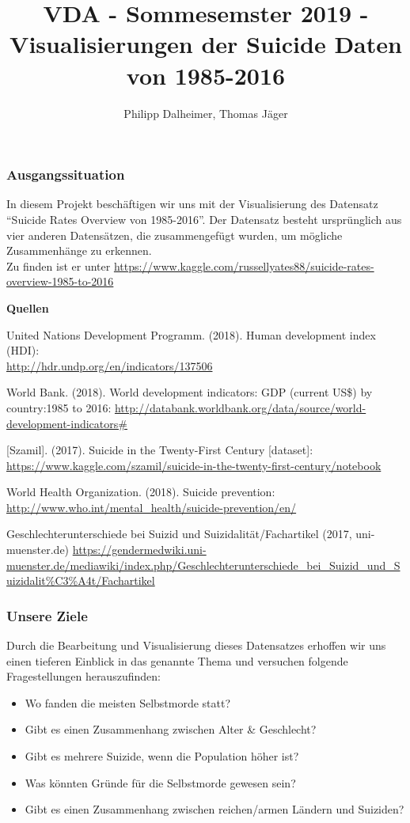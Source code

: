 \documentclass[]{article}
\title{VDA - Sommesemster 2019 - Visualisierungen der Suicide Daten von
1985-2016}
\author{Philipp Dalheimer, Thomas Jäger}
\date{}
\providecommand{\tightlist}{%
  \setlength{\itemsep}{0pt}\setlength{\parskip}{0pt}}
\begin{document}
\maketitle

\hypertarget{ausgangssituation}{%
\subsubsection{Ausgangssituation}\label{ausgangssituation}}

In diesem Projekt beschäftigen wir uns mit der Visualisierung des
Datensatz ``Suicide Rates Overview von 1985-2016''. Der Datensatz
besteht ursprünglich aus vier anderen Datensätzen, die zusammengefügt
wurden, um mögliche Zusammenhänge zu erkennen.\\
Zu finden ist er unter
\url{https://www.kaggle.com/russellyates88/suicide-rates-overview-1985-to-2016}

\textbf{Quellen}

United Nations Development Programm. (2018). Human development index
(HDI):\\
\url{http://hdr.undp.org/en/indicators/137506}

World Bank. (2018). World development indicators: GDP (current US\$) by
country:1985 to 2016:
\url{http://databank.worldbank.org/data/source/world-development-indicators\#}

{[}Szamil{]}. (2017). Suicide in the Twenty-First Century
{[}dataset{]}:\\
\url{https://www.kaggle.com/szamil/suicide-in-the-twenty-first-century/notebook}

World Health Organization. (2018). Suicide prevention:
\url{http://www.who.int/mental_health/suicide-prevention/en/}

Geschlechterunterschiede bei Suizid und Suizidalität/Fachartikel (2017,
uni-muenster.de)
\url{https://gendermedwiki.uni-muenster.de/mediawiki/index.php/Geschlechterunterschiede_bei_Suizid_und_Suizidalit\%C3\%A4t/Fachartikel}

\hypertarget{unsere-ziele}{%
\subsubsection{Unsere Ziele}\label{unsere-ziele}}

Durch die Bearbeitung und Visualisierung dieses Datensatzes erhoffen wir
uns einen tieferen Einblick in das genannte Thema und versuchen folgende
Fragestellungen herauszufinden:

\begin{itemize}
\tightlist
\item
  Wo fanden die meisten Selbstmorde statt?
\item
  Gibt es einen Zusammenhang zwischen Alter \& Geschlecht?
\item
  Gibt es mehrere Suizide, wenn die Population höher ist?
\item
  Was könnten Gründe für die Selbstmorde gewesen sein?
\item
  Gibt es einen Zusammenhang zwischen reichen/armen Ländern und
  Suiziden?
\end{itemize}
\end{document}

